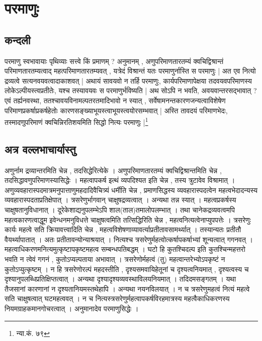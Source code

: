 \chapter{परमाणुः}

\section{कन्दली} परमाणु स्वभावायाः पृथिव्याः सत्त्वे किं प्रमाणम् ? अनुमानम् , अणुपरिमाणतारतम्यं क्वचिद्विश्रान्तं परिमाणतारतम्यत्वाद् महत्परिमाणतारतम्यवत् , यत्रेदं विश्रान्तं यतः परमाणुर्नास्ति स परमाणुः | अत एव नित्यो द्रव्यत्वे सत्यनवयवत्वादाकाशवत् | अथायं सावयवो न तर्हि परमाणुः, कार्यपरिमाणापेक्षया तदवयवपरिमाणस्य लोकेऽल्पीयस्त्वप्रतीतेः, यश्च तस्यावयवः स परमाणुर्भविष्यति | अथ सोऽपि न भवति, अवयवान्तरसद्भावात् ? एवं तर्ह्यनवस्था, ततश्चावयविनामल्पतरतमादिभावो न स्यात् , सर्वेषामनन्तकारणजन्यत्वाविशेषेण परिमाणप्रकर्षाप्रकर्षहेतोः कारणसङ्ख्याभूयस्त्वाभूयस्त्वयोरसम्भवात् | अस्ति तावदयं परिमाणभेदः, तस्मादणुपरिमाणं क्वचिन्निरतिशयमिति सिद्धो नित्यः परमाणुः |\footnote{न्या.कं. ७९}

\section{अत्र वल्लभाचार्यास्तु} अणुर्नाम द्रव्यान्तरमिति चेन्न , तदसिद्धेरित्येके । अणुपरिमाणतारतम्यं क्वचिद्विश्रान्तमिति चेन्न , तदसिद्धावणुपरिमाणस्यासिद्धेः । महत्वापकर्ष इत्थं व्यपदिश्यत इति चेन्न , तस्य त्रुटावेव विश्रामात् । अणुव्यवहारास्पदमात्रमनुपात्ताणुमहदादिवैचित्र्यं धर्मीति चेन्न , प्रमाणसिद्धस्य व्यवहारास्पदत्वेन महत्वभेदादन्यस्य व्यवहारास्पदताप्रतिक्षेपात् । त्रसरेणुर्भागवान् चाक्षुषद्रव्यत्वात् । अन्यथा तन्न स्यात् । महत्वप्रकर्षस्य चाक्षुषतानुविधानात् । दूरेकेशाद्यनुपलम्भेऽपि शाल(ताल)तमालोपलम्भात् । तथा चानेकद्रव्यवत्वमपि महत्वकारणत्वाद्धूम इवेन्धनमनुविधत्ते चाक्षुषत्वमिति तत्सिद्धिरिति चेन्न , महत्वनित्यत्वेनाप्युपपत्तेः । त्रसरेणुः कार्यः महत्वे सति क्रियावत्त्वादिति चेन्न , महत्वविशेषणाव्यावर्त्याप्रतीतावसामर्थ्यात् । तस्यान्यतः प्रतीतौ वैयर्थ्यापातात् । अतः प्रतीतावन्योन्याश्रयात् । नित्यश्च त्रसरेणुर्महत्वोत्कर्षापकर्षाभ्यां शून्यत्वात् गगनवत् । महत्वाधिकरणमनित्यमुत्कृष्टापकृष्टमहत्व सम्बन्धपतिबद्धम् । घटो हि कुतश्चिदल्प इति कुतश्चिन्महत्तरो भवति न त्वेवं गगनं , कुतोऽप्यल्पताया अभावात् । त्रसरेणोर्महत्वं (तु) महत्वान्तरेभ्योऽपकृष्टं न कुतोऽप्युत्कृष्टम् । न हि त्रसरेणोरल्पं महदस्तीति , दृश्यसमवायिहेतूनां च दृश्यत्वनियमात् , दृश्यत्वस्य च दृश्यानुपलब्धिप्रतिक्षिप्तत्वात् । अन्यथा दृश्यादृश्यव्यवस्थाविलयनियमात् । तदिदमसङ्गतम् । यथा तैजसानां कारणानां न दृश्यतानियमस्तथेहापि । अन्यथा नयनविलयात् । न च त्रसरेणुमहत्वं नित्यं महत्वे सति चाक्षुषत्वात् घटमहत्ववत् । न च नित्यस्त्रसरेणुर्महत्वापकर्षविरहमात्रस्य महत्वैकाधिकरणस्य नियमग्राहकमानगोचरत्वात् । अनुमानादेव परमाणुसिद्धेः ।

